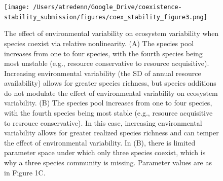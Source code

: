 \documentclass[12pt,]{article}
\begin{document}
\newpage{}

\begin{figure}[!ht]
  \centering
      \texttt{[image: /Users/atredenn/Google\_Drive/coexistence-stability\_submission/figures/coex\_stability\_figure3.png]}
  \caption{The effect of environmental variability on ecosystem variability when species coexist via relative nonlinearity. (A) The species pool increases from one to four species, with the fourth species being most unstable (e.g., resource conservative to resource acquisitive). Increasing environmental variability (the SD of annual resource availability) allows for greater species richness, but species additions do not modulate the effect of environmental variability on ecosystem variability. (B) The species pool increases from one to four species, with the fourth species being most stable (e.g., resource acquisitive to resrouce conservative). In this case, increasing environmental variability allows for greater realized species richness and can temper the effect of environmental variability. In (B), there is limited parameter space under which only three species coexist, which is why a three species community is missing. Parameter values are as in Figure 1C.}
\end{figure}

\newpage{}
\end{document}
